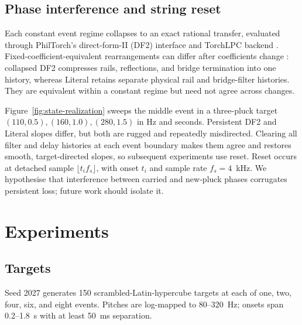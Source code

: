 \documentclass[conference]{IEEEtran}
\begin{document}
\subsection{Phase interference and string reset}
Each constant event regime collapses to an exact rational transfer, evaluated
through PhilTorch's direct-form-II (DF2) interface and TorchLPC backend
\cite{yu2025philtorch}. Fixed-coefficient-equivalent rearrangements can differ
after coefficients change \cite{yu2024torchlpc}: collapsed DF2 compresses rails,
reflections, and bridge termination into one history, whereas Literal retains
separate physical rail and bridge-filter histories. They are equivalent within
a constant regime but need not agree across changes.

Figure~\ref{fig:state-realization} sweeps the middle event in a three-pluck
target $(110,0.5),(160,1.0),(280,1.5)$ in Hz and seconds. Persistent DF2 and
Literal slopes differ, but both are rugged and repeatedly misdirected. Clearing
all filter and delay histories at each event boundary makes them agree and
restores smooth, target-directed slopes, so subsequent experiments use reset.
Reset occurs at detached sample $\lfloor t_i f_s\rfloor$, with onset $t_i$ and
sample rate $f_s=4$~kHz. We hypothesise that interference between carried and
new-pluck phases corrugates persistent loss; future work should isolate it.

\section{Experiments}
\subsection{Targets}
Seed 2027 generates 150 scrambled-Latin-hypercube targets at each of one, two,
four, six, and eight events. Pitches are log-mapped to 80--320~Hz; onsets span
0.2--1.8~s with at least 50~ms separation.
\end{document}
